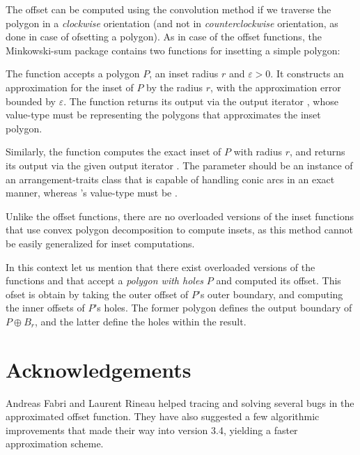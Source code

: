 The offset can be computed using the convolution method if we traverse the
polygon in a {\em clockwise} orientation (and not in {\em counterclockwise}
orientation, as done in case of ofsetting a polygon).
As in case of the offset functions, the Minkowski-sum package contains two
functions for insetting a simple polygon:

The function   accepts a polygon
$P$, an inset radius $r$ and $\varepsilon > 0$. It constructs an
approximation for the inset of $P$ by the radius $r$, with the approximation
error bounded by $\varepsilon$. The function returns its output via the
output iterator , whose value-type must be
 representing
the polygons that approximates the inset polygon.


Similarly, the function  computes
the exact inset of $P$ with radius $r$, and returns its output via the given
output iterator . The  parameter should be an instance of
an arrangement-traits class that is capable of handling conic arcs in an
exact manner, whereas 's value-type must be
.


\begin{ccAdvanced}
Unlike the offset functions, there are no overloaded versions of the inset
functions that use convex polygon decomposition to compute insets, as this
method cannot be easily generalized for inset computations.
\end{ccAdvanced}

In this context let us mention that there exist overloaded versions of the
functions  and
 that accept a {\em polygon with holes}
$P$ and computed its offset. This ofset is obtain by taking the outer offset
of $P$'s outer boundary, and computing the inner offsets of $P$'s holes.
The former polygon defines the output boundary of $P \oplus B_r$, and the latter
define the holes within the result.

\section*{Acknowledgements}

Andreas Fabri and Laurent Rineau helped tracing and solving several bugs in
the approximated offset function. They have also suggested a few algorithmic
improvements that made their way into version 3.4, yielding a faster approximation
scheme.

